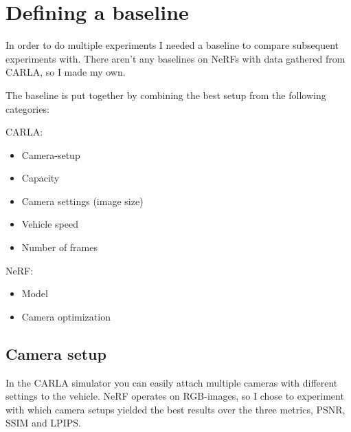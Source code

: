 \begin{comment}
\begin{table}
\centering
\caption{Results for exp_speed-2}
\label{tab:exp_speed-2}
\begin{tabular}{|l|c|c|c|c|}
\toprule
 & description & psnr & ssim & lpips \\
\midrule
0 & 0 & {\cellcolor{green}} 24.061440 & {\cellcolor{green}} 0.775393 & {\cellcolor{red}} 0.181360 \\
\cline{1-5}
1 & 1 & 23.502066 & 0.755476 & 0.184455 \\
\cline{1-5}
2 & 2 & 23.411259 & 0.742473 & 0.189968 \\
\cline{1-5}
3 & 3 & {\cellcolor{red}} 22.717318 & {\cellcolor{red}} 0.713858 & {\cellcolor{green}} 0.200099 \\
\cline{1-5}
\bottomrule
\end{tabular}
\end{table}

\end{comment}

\section{Defining a baseline}

In order to do multiple experiments I needed a baseline to compare subsequent experiments with. There aren't any baselines on NeRFs with data gathered from CARLA, so I made my own.

The baseline is put together by combining the best setup from the following categories:

CARLA:
\begin{itemize}
    \item Camera-setup
    \item Capacity
    \item Camera settings (image size)
    \item Vehicle speed
    \item Number of frames
\end{itemize}

NeRF:
\begin{itemize}
    \item Model
    \item Camera optimization
\end{itemize}

\subsection{Camera setup}
In the CARLA simulator you can easily attach multiple cameras with different settings to the vehicle. NeRF operates on RGB-images, so I chose to experiment with which camera setups yielded the best results over the three metrics, PSNR, SSIM and LPIPS.

